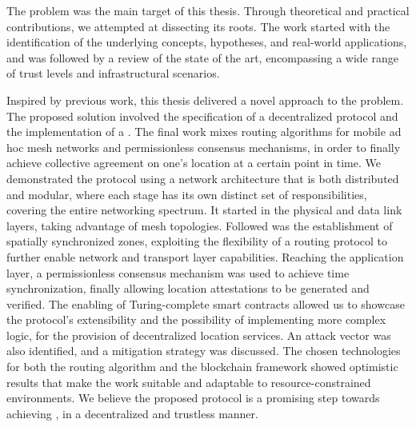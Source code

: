The \pol{} problem was the main target of this thesis. Through theoretical and practical contributions, we attempted at dissecting its roots. The work started with the identification of the underlying concepts, hypotheses, and real-world applications, and was followed by a review of the state of the art, encompassing a wide range of trust levels and infrastructural scenarios. 

Inspired by previous work, this thesis delivered a novel approach to the problem. The proposed solution involved the specification of a decentralized \pol{} protocol and the implementation of a \poc{}. The final work mixes routing algorithms for mobile ad hoc mesh networks and permissionless consensus mechanisms, in order to finally achieve collective agreement on one's location at a certain point in time. We demonstrated the protocol using a network architecture that is both distributed and modular, where each stage has its own distinct set of responsibilities, covering the entire networking spectrum. It started in the physical and data link layers, taking advantage of mesh topologies. Followed was the establishment of spatially synchronized zones, exploiting the flexibility of a routing protocol to further enable network and transport layer capabilities. Reaching the application layer, a permissionless consensus mechanism was used to achieve time synchronization, finally allowing location attestations to be generated and verified. The enabling of Turing-complete smart contracts allowed us to showcase the protocol's extensibility and the possibility of implementing more complex logic, for the provision of decentralized location services. An attack vector was also identified, and a mitigation strategy was discussed. The chosen technologies for both the routing algorithm and the blockchain framework showed optimistic results that make the work suitable and adaptable to resource-constrained environments. We believe the proposed protocol is a promising step towards achieving \pol{}, in a decentralized and trustless manner.

